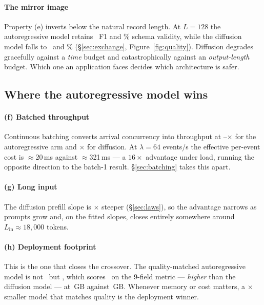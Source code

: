 \paragraph{The mirror image}
Property (e) inverts below the natural record length. At $L{=}128$ the
autoregressive model retains \arFOneTwentyEight\ F1 and
\arValidTwentyEight\% schema validity, while the diffusion model falls to
\dgFOneTwentyEight\ and \dgValidTwentyEight\% (\S\ref{sec:exchange},
Figure~\ref{fig:quality}). Diffusion degrades gracefully against a
\emph{time} budget and catastrophically against an \emph{output-length}
budget. Which one an application faces decides which architecture is safer.

\subsection{Where the autoregressive model wins}

\paragraph{(f) Batched throughput}
Continuous batching converts arrival concurrency into throughput at
\arBatchLo--\arBatchHi$\times$ for the autoregressive arm and
\dgBatchMult$\times$ for diffusion. At $\lambda{=}64$ events/s the effective
per-event cost is $\approx$20\,ms against $\approx$321\,ms --- a $16\times$
advantage under load, running the opposite direction to the batch-1 result.
\S\ref{sec:batching} takes this apart.

\paragraph{(g) Long input}
The diffusion prefill slope is $\times$ steeper
(\S\ref{sec:laws}), so the advantage narrows as prompts grow and, on the
fitted slopes, closes entirely somewhere around $L_{\mathrm{in}} \approx
18{,}000$ tokens.

\paragraph{(h) Deployment footprint}
This is the one that closes the crossover. The quality-matched autoregressive
model is not \ARthree\ but \ARoneb, which scores \arOneFiveFnine\ on the
9-field metric --- \emph{higher} than the diffusion model --- at
\arOneFiveWeights\,GB against \dgWeights\,GB. Whenever memory or cost matters,
a \footprintRatio$\times$ smaller model that matches quality is the deployment
winner.

